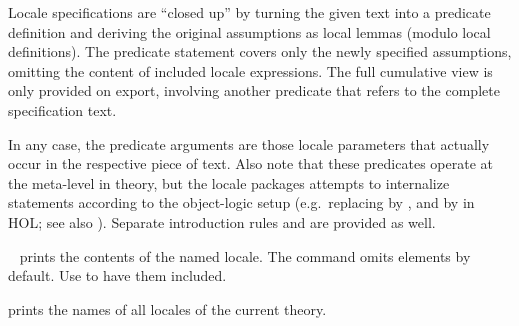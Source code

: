 \begin{isabellebody}
\begin{isamarkuptext}
\begin{description}
  \medskip Locale specifications are ``closed up'' by
  turning the given text into a predicate definition  and deriving the original assumptions as local lemmas
  (modulo local definitions).  The predicate statement covers only the
  newly specified assumptions, omitting the content of included locale
  expressions.  The full cumulative view is only provided on export,
  involving another predicate  that refers to the complete
  specification text.
  
  In any case, the predicate arguments are those locale parameters
  that actually occur in the respective piece of text.  Also note that
  these predicates operate at the meta-level in theory, but the locale
  packages attempts to internalize statements according to the
  object-logic setup (e.g.\ replacing  by , and
   by  in HOL; see also
  ).  Separate introduction rules  and  are provided as well.
  
  \item \hyperlink{command.print-locale}{\mbox{}}~ prints the
  contents of the named locale.  The command omits \hyperlink{element.notes}{\mbox{}}
  elements by default.  Use \hyperlink{command.print-locale}{\mbox{}} to
  have them included.

  \item \hyperlink{command.print-locales}{\mbox{}} prints the names of all locales
  of the current theory.


\end{description}
\end{isamarkuptext}
\end{isabellebody}
